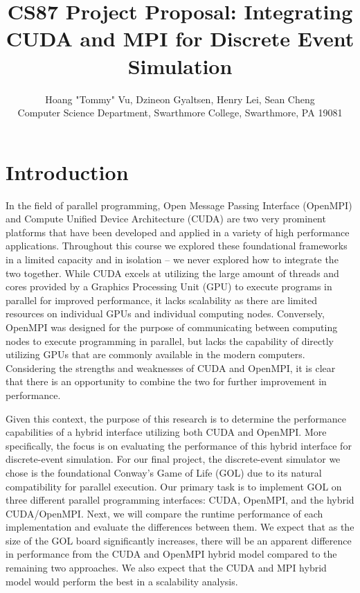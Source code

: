 \documentclass[11pt]{article}
\begin{document}

\title{CS87 Project Proposal: Integrating CUDA and MPI for Discrete Event Simulation}

\author{Hoang "Tommy" Vu, Dzineon Gyaltsen, Henry Lei, Sean Cheng \\ 
Computer Science Department, Swarthmore College, Swarthmore, PA  19081}

\maketitle

\section {Introduction}\label{intro} 

In the field of parallel programming, Open Message Passing Interface (OpenMPI) and Compute Unified Device Architecture (CUDA) are two very prominent platforms that have been developed and applied in a variety of high performance applications. Throughout this course we explored these foundational frameworks in a limited capacity and in isolation -- we never explored how to integrate the two together. While CUDA excels at utilizing the large amount of threads and cores provided by a Graphics Processing Unit (GPU) to execute programs in parallel for improved performance, it lacks scalability as there are limited resources on individual GPUs and individual computing nodes. Conversely, OpenMPI was designed for the purpose of communicating between computing nodes to execute programming in parallel, but lacks the capability of directly utilizing GPUs that are commonly available in the modern computers. Considering the strengths and weaknesses of CUDA and OpenMPI, it is clear that there is an opportunity to combine the two for further improvement in performance.

Given this context, the purpose of this research is to determine the performance capabilities of a hybrid interface utilizing both CUDA and OpenMPI. More specifically, the focus is on evaluating the performance of this hybrid interface for discrete-event simulation. For our final project, the discrete-event simulator we chose is the foundational Conway's Game of Life (GOL) due to its natural compatibility for parallel execution. Our primary task is to implement GOL on three different parallel programming interfaces: CUDA, OpenMPI, and the hybrid CUDA/OpenMPI. Next, we will compare the runtime performance of each implementation and evaluate the differences between them. We expect that as the size of the GOL board significantly increases, there will be an apparent difference in performance from the CUDA and OpenMPI hybrid model compared to the remaining two approaches. We also expect that the CUDA and MPI hybrid model would perform the best in a scalability analysis. 
\end{document}
